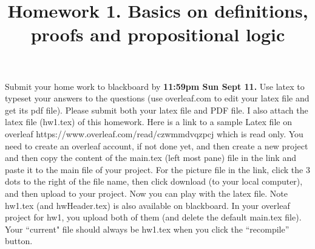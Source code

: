\documentclass[12pt, letterpaper]{article}
\newcommand{\duedate}{
      11:59pm Sun Sept 11.}
\begin{document}
\newcommand{\ie}[1] {
  \begin{itemize}
    #1
  \end{itemize}
}

\newcommand{\hide}[1]{}
\newcommand{\set}[1]{\{#1\}}
\newtheorem{definition}{Definition}


\title{{\bf Homework 1}. Basics on definitions, proofs and propositional logic}
\date{}
\maketitle



Submit your home work to blackboard by {\bf \duedate}
Use latex to typeset your answers to the questions (use overleaf.com to edit your latex file and get its pdf file). Please submit both your latex file and PDF file. I also attach the latex file (hw1.tex) of this homework.  Here is a link to a sample Latex file on overleaf https://www.overleaf.com/read/czwmmdvqzpcj which is read only. You need to create an overleaf account, if not done yet, and then create a new project and then copy the content of the main.tex (left most pane) file in the link  and paste it to the main file of your project. For the picture file in the link, click the 3 dots to the right of the file name, then click download (to your local computer), and then upload to your project. Now you can play with the latex file. Note hw1.tex (and hwHeader.tex) is also available on blackboard. In your overleaf project for hw1, you upload both of them (and delete the default main.tex file). Your ``current" file should always be hw1.tex when you click the ``recompile'' button.  
\end{document}

